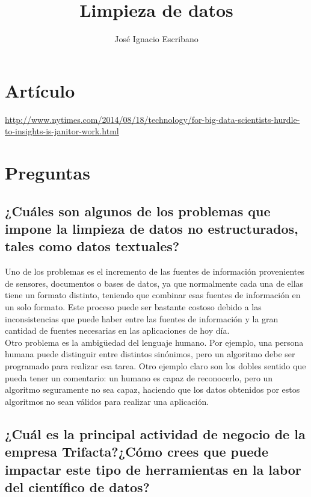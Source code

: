 \documentclass[12pt,a4paper,twoside,openright,titlepage,final]{article}
\author{José Ignacio Escribano}
\title{Limpieza de datos}
\begin{document}
\setcounter{page}{1}


\tableofcontents
\thispagestyle{empty}
\newpage

\setcounter{page}{1}

\section{Artículo}

\url{http://www.nytimes.com/2014/08/18/technology/for-big-data-scientists-hurdle-to-insights-is-janitor-work.html}

\section{Preguntas}
\subsection{¿Cuáles son algunos de los problemas que impone la limpieza de datos no estructurados, tales como datos textuales?}

Uno de los problemas es el incremento de las fuentes de información provenientes de sensores, documentos o bases de datos, ya que normalmente cada una de ellas tiene un formato distinto, teniendo que combinar esas fuentes de información en un solo formato. Este proceso puede ser bastante costoso debido a las inconsistencias que puede haber entre las fuentes de información y la gran cantidad de fuentes necesarias en las aplicaciones de hoy día.\\

Otro problema es la ambigüedad del lenguaje humano. Por ejemplo, una persona humana puede distinguir entre distintos sinónimos, pero un algoritmo debe ser programado para realizar esa tarea. Otro ejemplo claro son los dobles sentido que pueda tener un comentario: un humano es capaz de reconocerlo, pero un algoritmo seguramente no sea capaz, haciendo que los datos obtenidos por estos algoritmos no sean válidos para realizar una aplicación. 

\subsection{¿Cuál es la principal actividad de negocio de la empresa Trifacta?¿Cómo crees que puede impactar este tipo de herramientas en la labor del científico de datos?}
\end{document}
